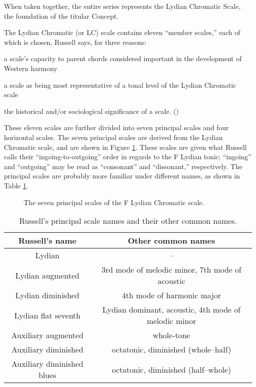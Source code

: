 \noindent When taken together, the entire series represents the Lydian
Chromatic Scale, the foundation of the titular Concept.

The Lydian Chromatic (or LC) scale contains eleven ``member scales,'' each of
which is chosen, Russell says, for three reasons:%
%
\begin{compactenum}[\qquad a.\ ]
    \singlespacing
    \item a scale's capacity to parent chords considered important in the
      development of Western harmony
    \item a scale as being most representative of a tonal level of the Lydian
      Chromatic scale
    \item the historical and/or sociological significance of a
      scale. ()
\end{compactenum}
%
These eleven scales are further divided into seven principal scales and four
horizontal scales. The seven principal scales are derived from the Lydian
Chromatic scale, and are shown in Figure \ref{lcc:principal-scales}. These
scales are given what Russell calls their ``ingoing-to-outgoing'' order in
regards to the F Lydian tonic; ``ingoing'' and ``outgoing'' may be read as
``consonant'' and ``dissonant,'' respectively.
The principal scales are probably more familiar under different names, as shown in
Table \ref{lcc:scale-names}.

\begin{figure}[p]
  \caption{The seven principal scales of the F Lydian Chromatic scale.}
  \label{lcc:principal-scales}
\end{figure}

\begin{table}[p]
  \setlength{\tabcolsep}{12pt}
  \centering
  \begin{tabular}{cc}
   Russell's name  & Other common names \\
   \hline
   \rule[1em]{0ex}{1ex}%
   Lydian & -- \\
   Lydian augmented & 3rd mode of melodic minor, 7th mode of acoustic \\
   Lydian diminished & 4th mode of harmonic major \\
   Lydian flat seventh & Lydian dominant, acoustic, 4th mode of melodic minor \\
   Auxiliary augmented & whole-tone \\
   Auxiliary diminished & octatonic, diminished (whole--half) \\
   Auxiliary diminished blues & octatonic, diminished (half--whole)
  \end{tabular}
  \caption{Russell's principal scale names and their other common names.}
  \label{lcc:scale-names}
\end{table}

